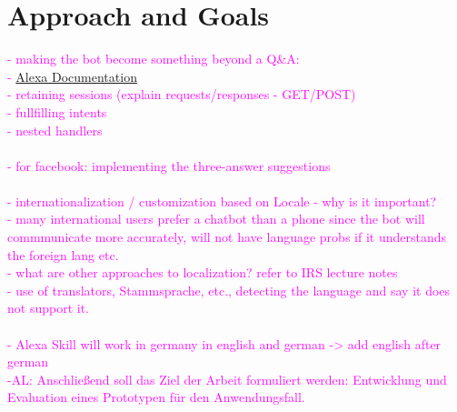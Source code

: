 \section{Approach and Goals}
\textcolor{magenta}{
	- making the bot become something beyond a Q\&A:\\
	- \href{https://www.youtube.com/watch?v=QxgdPI1B7rg}{Alexa Documentation}\\
	- retaining sessions (explain requests/responses - GET/POST)\\
	- fullfilling intents\\
	- nested handlers\\
	\\
	- for facebook: implementing the three-answer suggestions\\
	\\
	- internationalization / customization based on Locale
	- why is it important?\\
	- many international users prefer a chatbot than a phone since the bot will commmunicate more accurately, will not have language probs if it understands the foreign lang etc.\\
	- what are other approaches to localization? refer to IRS lecture notes\\
	- use of translators, Stammsprache, etc., detecting the language and say it does not support it.\\ 
	\\
	- Alexa Skill will work in germany in english and german -> add english after german\\
	-AL: Anschlie{\ss}end soll das Ziel der Arbeit formuliert werden: Entwicklung und Evaluation eines Prototypen f\"ur den Anwendungsfall.\\
}

